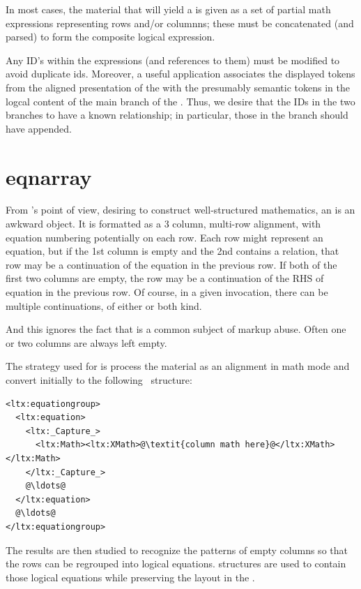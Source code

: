 \documentclass{book}
\begin{document}
In most cases, the material that will yield a 
is given as a set of partial math expressions representing rows and/or columnns;
these must be concatenated (and parsed) to form the composite logical expression.

Any ID's within the expressions (and references to them) must be modified
to avoid duplicate ids.  Moreover, a useful application associates the
displayed tokens from the aligned presentation of the 
with the presumably semantic tokens in the logcal content of the main branch
of the .  Thus, we desire that the IDs in the two
branches to have a known relationship; in particular, those in the branch
should have  appended.


\section{eqnarray}\label{eqnarray}
From \LaTeXML's point of view, desiring to construct well-structured mathematics,
an  is an awkward object.
It is formatted as a 3 column, multi-row alignment, with equation
numbering potentially on each row.
Each row might represent an equation, but if the 1st column is empty
and the 2nd contains a relation, that row may be a continuation of the
equation in the previous row.  If both of the first two columns are empty,
the row may be a continuation of the RHS of equation in the previous row.
Of course, in a given invocation, there can be multiple continuations,
of either or both kind.

And this ignores the fact that  is a common subject of markup abuse.
Often one or two columns are always left empty.

The strategy used for  is process the material as
an alignment in math mode and convert initially to the following \XML\ structure:
\begin{lstlisting}[style=xml]
<ltx:equationgroup>
  <ltx:equation>
    <ltx:_Capture_>
      <ltx:Math><ltx:XMath>@\textit{column math here}@</ltx:XMath></ltx:Math>
    </ltx:_Capture_>
    @\ldots@
  </ltx:equation>
  @\ldots@
</ltx:equationgroup>
\end{lstlisting}
The results are then studied to recognize the patterns of empty columns
so that the rows can be regrouped into logical equations.  
structures are used to contain those logical equations while preserving
the layout in the .
\end{document}
